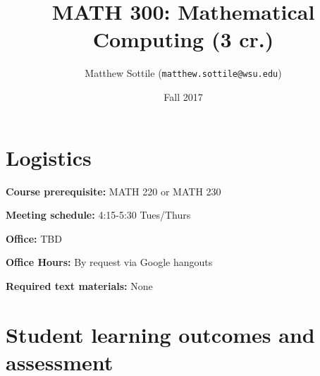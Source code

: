 \documentclass[12pt]{article}
\title{MATH 300: Mathematical Computing (3 cr.)}
\author{Matthew Sottile (\texttt{matthew.sottile@wsu.edu})}
\date{Fall 2017}
\begin{document}
\maketitle

\section*{Logistics}

\noindent \textbf{Course prerequisite:} MATH 220 or MATH 230

\noindent \textbf{Meeting schedule:} 4:15-5:30 Tues/Thurs

\noindent \textbf{Office:} TBD

\noindent \textbf{Office Hours:} By request via Google hangouts


\noindent \textbf{Required text materials:}
None

\section*{Student learning outcomes and assessment}
\end{document}
